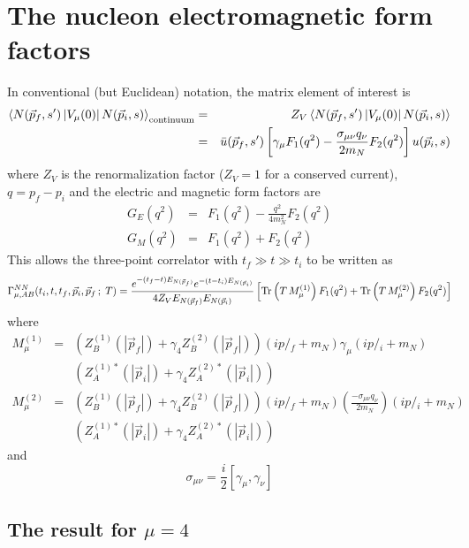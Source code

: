 \documentclass[12pt]{article}
\begin{document}
\section{The nucleon electromagnetic form factors}

In conventional (but Euclidean) notation, the matrix element of interest is
\begin{eqnarray}
\left<N(\vec{p}_f,s^\prime)\left|V_\mu(0)\right|N(\vec{p}_i,s)
     \right>_{\rm continuum}
&=& Z_V\left<N(\vec{p}_f,s^\prime)\left|V_\mu(0)\right|N(\vec{p}_i,s)\right>
    \nonumber \\
&=& \bar{u}(\vec{p}_f,s^\prime)\left[\gamma_\mu F_1(q^2)
   - \frac{\sigma_{\mu\nu}q_\nu}{2m_N}F_2(q^2)\right]u(\vec{p}_i,s)
\end{eqnarray}
where $Z_V$ is the renormalization factor ($Z_V=1$ for a conserved current),
$q=p_f-p_i$ and the electric and magnetic form factors are
\begin{eqnarray}
G_E(q^2) &=& F_1(q^2) - \frac{q^2}{4m_N^2}F_2(q^2) \\
G_M(q^2) &=& F_1(q^2) + F_2(q^2)
\end{eqnarray}
This allows the three-point correlator with $t_f\gg t\gg t_i$ to be written as
\[
\Gamma^{NN}_{\mu,AB}(t_i,t,t_f,\vec{p}_i,\vec{p}_f\,;\;T)
= \frac{e^{-(t_f-t)E_{N(\vec{p}_f)}}e^{-(t-t_i)E_{N(\vec{p}_i)}}}
   {4Z_VE_{N(\vec{p}_f)}E_{N(\vec{p}_i)}}
   \left[{\rm Tr}\left(T\,M^{(1)}_\mu\right)F_1(q^2)
   +{\rm Tr}\left(T\,M^{(2)}_\mu\right)F_2(q^2)\right]
\]
where
\begin{eqnarray}
M^{(1)}_\mu &=& 
     \left(Z_B^{(1)}(|\vec{p}_f|)+\gamma_4Z_B^{(2)}(|\vec{p}_f|)\right)
     \left(ip\!\!/\!_f+m_N\right)\gamma_\mu
     \left(ip\!\!/\!_i+m_N\right)
     \nonumber \\ &&
     \left(Z_A^{(1)*}(|\vec{p}_i|)+\gamma_4Z_A^{(2)*}(|\vec{p}_i|)\right)
     \nonumber \\
M^{(2)}_\mu &=& 
     \left(Z_B^{(1)}(|\vec{p}_f|)+\gamma_4Z_B^{(2)}(|\vec{p}_f|)\right)
     \left(ip\!\!/\!_f+m_N\right)
     \left(\frac{-\sigma_{\mu\nu}q_\nu}{2m_N}\right)
     \left(ip\!\!/\!_i+m_N\right)
     \nonumber \\ &&
     \left(Z_A^{(1)*}(|\vec{p}_i|)+\gamma_4Z_A^{(2)*}(|\vec{p}_i|)\right)
     \nonumber
\end{eqnarray}
and
\[
\sigma_{\mu\nu} = \frac{i}{2}\left[\gamma_\mu,\gamma_\nu\right]
\]

\subsection{The result for $\mu=4$}
\end{document}
